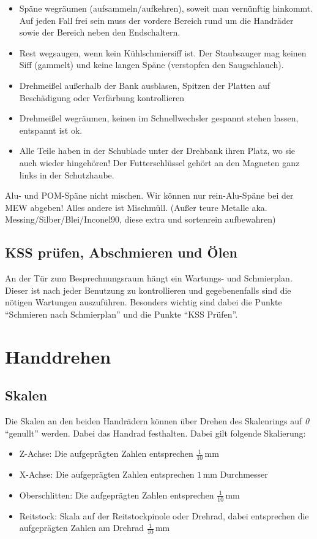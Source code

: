 \documentclass{\basedir/fablab-document}
\begin{document}
\begin{itemize}
 \item Späne wegräumen (aufsammeln/aufkehren), soweit man vernünftig hinkommt. Auf jeden Fall frei sein muss der vordere Bereich rund um die Handräder sowie der Bereich neben den Endschaltern.
 \item Rest wegsaugen, wenn kein Kühlschmiersiff ist. Der Staubsauger mag keinen Siff (gammelt) und keine langen Späne (verstopfen den Saugschlauch).
 \item Drehmeißel außerhalb der Bank ausblasen, Spitzen der Platten auf Beschädigung oder Verfärbung kontrollieren
 \item Drehmeißel wegräumen, keinen im Schnellwechsler gespannt stehen lassen, entspannt ist ok.
 \item Alle Teile haben in der Schublade unter der Drehbank ihren Platz, wo sie auch wieder hingehören! Der Futterschlüssel gehört an den Magneten ganz links in der Schutzhaube.
\end{itemize}


Alu- und POM-Späne nicht mischen. Wir können nur rein-Alu-Späne bei der MEW abgeben! Alles andere ist Mischmüll. (Außer teure Metalle aka. Messing/Silber/Blei/Inconel90, diese extra und sortenrein aufbewahren)

\subsection{KSS prüfen, Abschmieren und Ölen}
An der Tür zum Besprechnungsraum hängt ein Wartungs- und Schmierplan. Dieser ist nach jeder Benutzung zu kontrollieren und gegebenenfalls sind die nötigen Wartungen auszuführen. Besonders wichtig sind dabei die Punkte \enquote{Schmieren nach Schmierplan} und die Punkte \enquote{KSS Prüfen}.


\newpage
\section{Handdrehen}
\label{handdrehen}
\subsection{Skalen}

Die Skalen an den beiden Handrädern können über Drehen des Skalenrings auf \emph{0} \enquote{genullt} werden.
Dabei das Handrad festhalten.
Dabei gilt folgende Skalierung:
\begin{itemize}
\item Z-Achse: Die aufgeprägten Zahlen entsprechen $\frac{1}{10}$\,mm 
\item X-Achse: Die aufgeprägten Zahlen entsprechen $1$\,mm Durchmesser
\item Oberschlitten: Die aufgeprägten Zahlen entsprechen $\frac{1}{10}$\,mm 
\item Reitstock: Skala auf der Reitstockpinole oder Drehrad, dabei entsprechen die aufgeprägten Zahlen am Drehrad $\frac{1}{10}$\,mm
\end{itemize}
\end{document}
